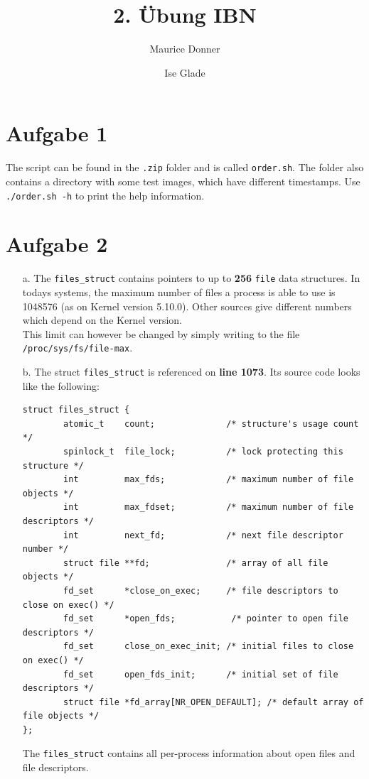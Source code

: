 \documentclass{article}
\title{\textsf{\color{blue!40!black}2. Übung IBN}}
\author{Maurice Donner \and Ise Glade}
\begin{document}
\maketitle

\section*{Aufgabe 1}
The script can be found in the \texttt{.zip} folder and is called \texttt{order.sh}.
The folder also contains a directory with some test images, which have different
timestamps. Use \texttt{./order.sh -h} to print the help information.

\section*{Aufgabe 2}
\begin{itemize}
    \item[a.] The \texttt{files\_struct} contains pointers to up to \textbf{256}
	\texttt{file} data structures. In todays systems, the maximum number of
	files a process is able to use is 1048576 (as on Kernel version 5.10.0).
	Other sources give different numbers which depend on the Kernel version.
	\\ This limit can however be changed by simply writing to the file\\
	\texttt{/proc/sys/fs/file-max}.
    \item[b.] The struct \texttt{files\_struct} is referenced on \textbf{line 1073}.
	Its source code looks like the following:
\begin{lstlisting}
struct files_struct {
        atomic_t    count;              /* structure's usage count */
        spinlock_t  file_lock;          /* lock protecting this structure */
        int         max_fds;            /* maximum number of file objects */
        int         max_fdset;          /* maximum number of file descriptors */
        int         next_fd;            /* next file descriptor number */
        struct file **fd;               /* array of all file objects */
        fd_set      *close_on_exec;     /* file descriptors to close on exec() */
        fd_set      *open_fds;           /* pointer to open file descriptors */
        fd_set      close_on_exec_init; /* initial files to close on exec() */
        fd_set      open_fds_init;      /* initial set of file descriptors */
        struct file *fd_array[NR_OPEN_DEFAULT]; /* default array of file objects */
};
\end{lstlisting}
The \texttt{files\_struct} contains all per-process information about open files
and file descriptors.
\end{itemize}
\end{document}
